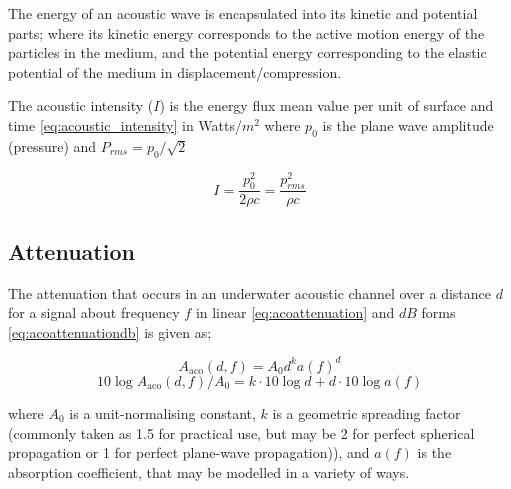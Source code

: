 The energy of an acoustic wave is encapsulated into its kinetic and potential parts; where its kinetic energy corresponds to the active motion energy of the particles in the medium, and the potential energy corresponding to the elastic potential of the medium in displacement/compression.

The acoustic intensity ($I$) is the energy flux mean value per unit of surface and time \autoref{eq:acoustic_intensity} in Watts/$m^2$ where $p_0$ is the plane wave amplitude (pressure) and $P_{rms} = p_0/\sqrt{2}$

\begin{equation}
  I = \frac{p_0^2}{2\rho c} = \frac{p_{rms}^2}{\rho c}
  \label{eq:acoustic_intensity}
\end{equation}

\subsection{Attenuation}

The attenuation that occurs in an underwater acoustic channel over a distance $d$ for a signal about frequency $f$ in linear \autoref{eq:acoattenuation} and $dB$ forms \autoref{eq:acoattenuationdb} is given as;

\begin{equation}
  \label{eq:acoattenuation}
  A_{\text{aco}}(d,f) = A_0d^ka(f)^d
\end{equation}
\begin{equation}
  \label{eq:acoattenuationdb}
  10 \log A_{\text{aco}}(d,f)/A_0 = k \cdot 10 \log d + d \cdot 10 \log a(f)
\end{equation}

where $A_0$ is a unit-normalising constant, $k$ is a geometric spreading factor (commonly taken as 1.5 for practical use, but may be 2 for perfect spherical propagation or 1 for perfect plane-wave propagation)), and $a(f)$ is the absorption coefficient, that may be modelled in a variety of ways.

